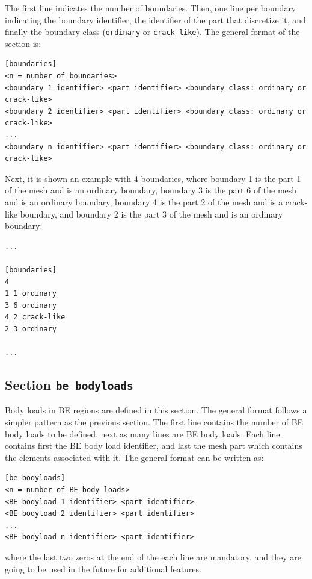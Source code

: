 \documentclass[a4paper,fleqn]{book}
\begin{document}
The first line indicates the number of boundaries. Then, one line per boundary indicating the boundary identifier, the identifier of the part that discretize it, and finally the boundary class (\texttt{ordinary} or \texttt{crack-like}). The general format of the section is:
\begin{Verbatim}[frame=single, fontsize=\small, label={general format of section [boundaries]}]
[boundaries]
<n = number of boundaries>
<boundary 1 identifier> <part identifier> <boundary class: ordinary or crack-like>
<boundary 2 identifier> <part identifier> <boundary class: ordinary or crack-like>
...
<boundary n identifier> <part identifier> <boundary class: ordinary or crack-like>
\end{Verbatim} 
Next, it is shown an example with 4 boundaries, where boundary 1 is the part 1 of the mesh and is an ordinary boundary, boundary 3 is the part 6 of the mesh and is an ordinary boundary, boundary 4 is the part 2 of the mesh and is a crack-like boundary, and boundary 2 is the part 3 of the mesh and is an ordinary boundary:
\begin{Verbatim}[frame=single, fontsize=\small, label=input.dat]
...

[boundaries]
4
1 1 ordinary 
3 6 ordinary
4 2 crack-like
2 3 ordinary

...
\end{Verbatim} 

\subsection{Section \texttt{be bodyloads}}

Body loads in BE regions are defined in this section. The general format follows a simpler pattern as the previous section. The first line contains the number of BE body loads to be defined, next as many lines are BE body loads. Each line contains first the BE body load identifier, and last the mesh part which contains the elements associated with it. The general format can be written as:
\begin{Verbatim}[frame=single, fontsize=\small, label={general format of section [fe subregions]}]
[be bodyloads]
<n = number of BE body loads>
<BE bodyload 1 identifier> <part identifier>
<BE bodyload 2 identifier> <part identifier>
...
<BE bodyload n identifier> <part identifier>
\end{Verbatim}
where the last two zeros at the end of the each line are mandatory, and they are going to be used in the future for additional features.
\end{document}
